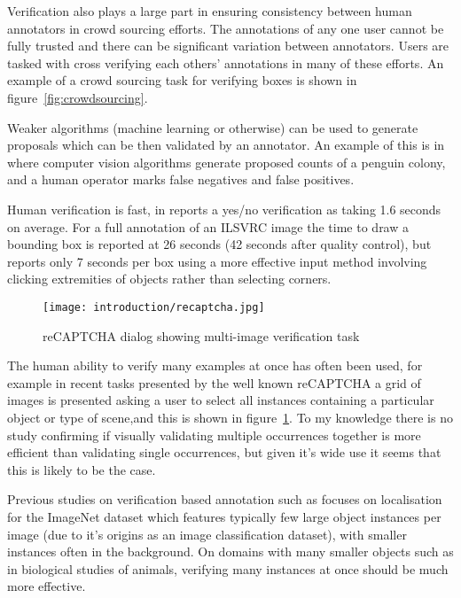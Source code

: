 Verification also plays a large part in ensuring consistency between human annotators in crowd sourcing efforts. The annotations of any one user cannot be fully trusted and there can be significant variation between annotators. Users are tasked with cross verifying each others' annotations in many of these efforts. An example of a crowd sourcing task \cite{Su2012a} for verifying boxes is shown in figure~\ref{fig:crowdsourcing}.

Weaker algorithms (machine learning or otherwise) can be used to generate proposals which can be then validated by an annotator. An example of this is in \cite{McNeill2011} where computer vision algorithms generate proposed counts of a penguin colony, and a human operator marks false negatives and false positives.

Human verification is fast, in \cite{Papadopoulos2016} reports a yes/no verification as taking 1.6 seconds on average. For a full annotation of an \gls{ILSVRC} image \cite {Su2012a} the time to draw a bounding box is reported at 26 seconds (42 seconds after quality control), but \cite{Papadopoulos2017} reports only 7 seconds per box using a more effective input method involving clicking extremities of objects rather than selecting corners. 

\begin{figure}[h]
  \centering
  \texttt{[image: introduction/recaptcha.jpg]}
  \caption{reCAPTCHA dialog showing multi-image verification task}  
  \label{fig:captcha}
\end{figure}

The human ability to verify many examples at once has often been used, for example in recent tasks presented by the well known reCAPTCHA \cite{von2008recaptcha} a grid of images is presented asking a user to select all instances containing a particular object or type of scene,and this is shown in figure~\ref{fig:captcha}. To my knowledge there is no study confirming if visually validating multiple occurrences together is more efficient than validating single occurrences, but given it's wide use it seems that this is likely to be the case. 

Previous studies on verification based annotation such as \cite{Papadopoulos2016} focuses on localisation for the ImageNet dataset which features typically few large object instances per image (due to it's origins as an image classification dataset), with smaller instances often in the background. On domains with many smaller objects such as in biological studies of animals, verifying many instances at once should be much more effective. 


